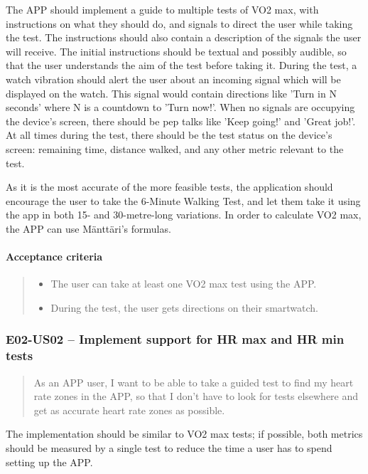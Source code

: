 The APP should implement a guide to multiple tests of VO2 max, with instructions on what they should do, and signals to direct the user while taking the test.
The instructions should also contain a description of the signals the user will receive.
The initial instructions should be textual and possibly audible, so that the user understands the aim of the test before taking it.
During the test, a watch vibration should alert the user about an incoming signal which will be displayed on the watch.
This signal would contain directions like 'Turn in N seconds' where N is a countdown to 'Turn now!'.
When no signals are occupying the device's screen, there should be pep talks like 'Keep going!' and 'Great job!'.
At all times during the test, there should be the test status on the device's screen: remaining time, distance walked, and any other metric relevant to the test.

As it is the most accurate of the more feasible tests, the application should encourage the user to take the 6-Minute Walking Test, and let them take it using the app in both 15- and 30-metre-long variations.
In order to calculate VO2 max, the APP can use Mänttäri's formulas.

\paragraph*{Acceptance criteria}
\begin{quote}
\begin{itemize}
    \item The user can take at least one VO2 max test using the APP.
    \item During the test, the user gets directions on their smartwatch.
\end{itemize}
\end{quote}

\subsubsection*{E02-US02 -- Implement support for HR max and HR min tests}
\begin{quote}
As an APP user, I want to be able to take a guided test to find my heart rate zones in the APP, so that I don't have to look for tests elsewhere and get as accurate heart rate zones as possible.
\end{quote}

The implementation should be similar to VO2 max tests; if possible, both metrics should be measured by a single test to reduce the time a user has to spend setting up the APP.

